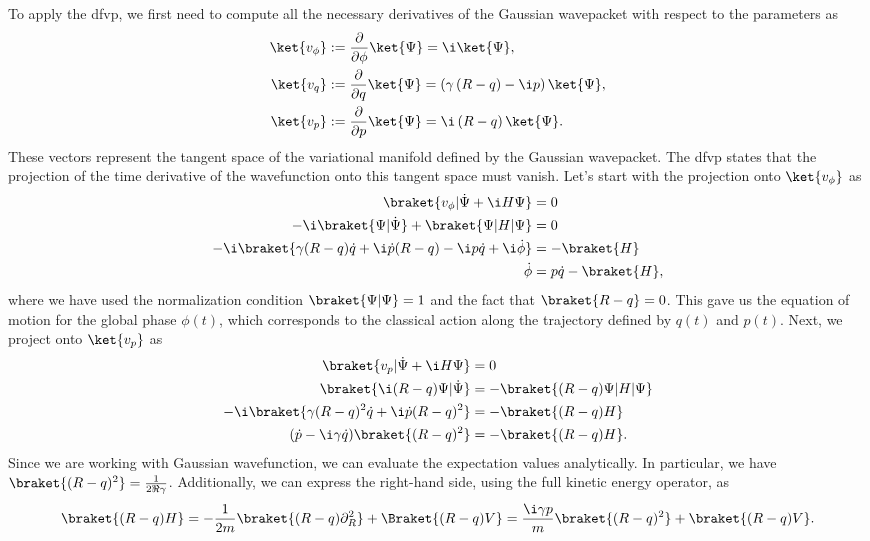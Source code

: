 To apply the \acrshort{dfvp}, we first need to compute all the necessary derivatives of the Gaussian wavepacket with respect to the parameters as
\begin{align}
\ket{v_\phi}&:=\frac{\partial}{\partial \phi}\ket{\Psi}=\i\ket{\Psi},\\
\ket{v_q}&:=\frac{\partial}{\partial q}\ket{\Psi}=\left(\gamma\left(R-q\right)-\i p\right)\ket{\Psi},\\
\ket{v_p}&:=\frac{\partial}{\partial p}\ket{\Psi}=\i\left(R-q\right)\ket{\Psi}.
\end{align}
These vectors represent the tangent space of the variational manifold defined by the Gaussian wavepacket. The \acrshort{dfvp} states that the projection of the time derivative of the wavefunction onto this tangent space must vanish. Let's start with the projection onto $\ket{v_\phi}$ as
\begin{align}
\braket{v_\phi|\dot\Psi+\i H\Psi}&=0\\
-\i\braket{\Psi|\dot\Psi}+\braket{\Psi|H|\Psi}&=0\\
-\i\braket{\gamma(R-q)\dot q+\i\dot p(R-q)-\i p\dot q+\i\dot\phi}&=-\braket{H}\\
\dot\phi&=p\dot q-\braket{H},\label{eq:gaussian_eom_phi}
\end{align}
where we have used the normalization condition $\braket{\Psi|\Psi}=1$ and the fact that $\braket{R-q}=0$. This gave us the equation of motion for the global phase $\phi(t)$, which corresponds to the classical action along the trajectory defined by $q(t)$ and $p(t)$. Next, we project onto $\ket{v_p}$ as
\begin{align}
\braket{v_p|\dot\Psi+\i H\Psi}&=0\\
\braket{\i(R-q)\Psi|\dot\Psi}&=-\braket{(R-q)\Psi|H|\Psi}\\
-\i\braket{\gamma(R-q)^2\dot q+\i\dot p(R-q)^2}&=-\braket{(R-q)H}\\
(\dot p-\i\gamma\dot q)\braket{(R-q)^2}&=-\braket{(R-q)H}.\label{eq:gaussian_eom_p}
\end{align}
Since we are working with Gaussian wavefunction, we can evaluate the expectation values analytically. In particular, we have $\braket{(R-q)^2}=\frac{1}{2\Re\gamma}$. Additionally, we can express the right-hand side, using the full kinetic energy operator, as
\begin{equation}
\braket{(R-q)H}=-\frac{1}{2m}\braket{(R-q)\partial_R^2}+\Braket{(R-q)V}=\frac{\i\gamma p}{m}\braket{(R-q)^2}+\braket{(R-q)V}.
\end{equation}
